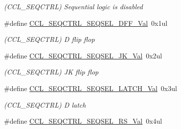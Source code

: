 \begin{DoxyCompactItemize}
\begin{DoxyCompactList}\small\item\em (C\+C\+L\+\_\+\+S\+E\+Q\+C\+T\+R\+L) Sequential logic is disabled \end{DoxyCompactList}\item 
\hypertarget{group___s_a_m_l21___c_c_l_ga0a98c9dc1d2c6f66e8d7c5d3443c7d47}{}\#define \hyperlink{group___s_a_m_l21___c_c_l_ga0a98c9dc1d2c6f66e8d7c5d3443c7d47}{C\+C\+L\+\_\+\+S\+E\+Q\+C\+T\+R\+L\+\_\+\+S\+E\+Q\+S\+E\+L\+\_\+\+D\+F\+F\+\_\+\+Val}~0x1ul\label{group___s_a_m_l21___c_c_l_ga0a98c9dc1d2c6f66e8d7c5d3443c7d47}

\begin{DoxyCompactList}\small\item\em (C\+C\+L\+\_\+\+S\+E\+Q\+C\+T\+R\+L) D flip flop \end{DoxyCompactList}\item 
\hypertarget{group___s_a_m_l21___c_c_l_ga002d4f2fedfc437e6a45f144ec5ab49c}{}\#define \hyperlink{group___s_a_m_l21___c_c_l_ga002d4f2fedfc437e6a45f144ec5ab49c}{C\+C\+L\+\_\+\+S\+E\+Q\+C\+T\+R\+L\+\_\+\+S\+E\+Q\+S\+E\+L\+\_\+\+J\+K\+\_\+\+Val}~0x2ul\label{group___s_a_m_l21___c_c_l_ga002d4f2fedfc437e6a45f144ec5ab49c}

\begin{DoxyCompactList}\small\item\em (C\+C\+L\+\_\+\+S\+E\+Q\+C\+T\+R\+L) J\+K flip flop \end{DoxyCompactList}\item 
\hypertarget{group___s_a_m_l21___c_c_l_ga3583624dff7abfed78f90739f9483bf5}{}\#define \hyperlink{group___s_a_m_l21___c_c_l_ga3583624dff7abfed78f90739f9483bf5}{C\+C\+L\+\_\+\+S\+E\+Q\+C\+T\+R\+L\+\_\+\+S\+E\+Q\+S\+E\+L\+\_\+\+L\+A\+T\+C\+H\+\_\+\+Val}~0x3ul\label{group___s_a_m_l21___c_c_l_ga3583624dff7abfed78f90739f9483bf5}

\begin{DoxyCompactList}\small\item\em (C\+C\+L\+\_\+\+S\+E\+Q\+C\+T\+R\+L) D latch \end{DoxyCompactList}\item 
\hypertarget{group___s_a_m_l21___c_c_l_ga190ccdf8b60ec2ab4a231060bcafa23d}{}\#define \hyperlink{group___s_a_m_l21___c_c_l_ga190ccdf8b60ec2ab4a231060bcafa23d}{C\+C\+L\+\_\+\+S\+E\+Q\+C\+T\+R\+L\+\_\+\+S\+E\+Q\+S\+E\+L\+\_\+\+R\+S\+\_\+\+Val}~0x4ul\label{group___s_a_m_l21___c_c_l_ga190ccdf8b60ec2ab4a231060bcafa23d}


\end{DoxyCompactItemize}
